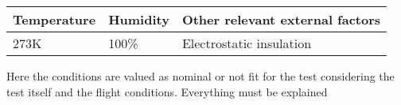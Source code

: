 \begin{table}[ht]
\centering
\begin{tabular}{ |p{2.5cm}|p{2.5cm}|p{5cm}| }
 \hline
 Temperature& Humidity &Other relevant external factors \\
 \hline
 273K   & 100\%    &Electrostatic insulation\\
 \hline
\end{tabular}
\end{table}

Here the conditions are valued as nominal or not fit for the test considering the test itself and the flight conditions. Everything must be explained